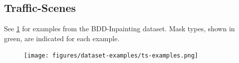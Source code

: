 \subsection{Traffic-Scenes}
See \cref{fig:ts-examples} for examples from the BDD-Inpainting dataset. Mask types, shown in green, are indicated for each example.
\begin{figure}[h!]
\begin{center}
    \centering
    \captionsetup{type=figure}
    \texttt{[image: figures/dataset-examples/ts-examples.png]}
    \label{fig:ts-examples}
\end{center}
\end{figure}